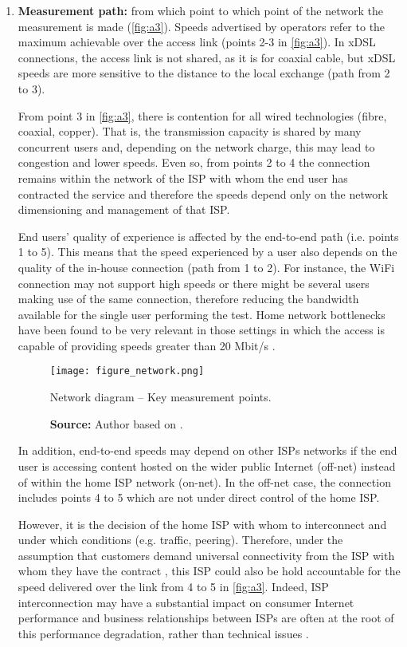 \documentclass[12pt]{article}
\begin{document}
\begin{enumerate}[label=\textbf{\arabic* --}]
	\item \textbf{Measurement path:} from which point to which point of the network the measurement is made (\autoref{fig:a3}). Speeds advertised by operators refer to the maximum achievable over the access link (points 2-3 in \autoref{fig:a3}). In xDSL connections, the access link is not shared, as it is for coaxial cable, but xDSL speeds are more sensitive to the distance to the local exchange (path from 2 to 3). 
	
	From point 3 in \autoref{fig:a3}, there is contention for all wired technologies (fibre, coaxial, copper). That is, the transmission capacity is shared by many concurrent users and, depending on the network charge, this may lead to congestion and lower speeds. Even so, from points 2 to 4 the connection remains within the network of the ISP with whom the end user has contracted the service and therefore the speeds depend only on the network dimensioning and management of that ISP.
	
	End users' quality of experience is affected by the end-to-end path (i.e. points 1 to 5). This means that the speed experienced by a user also depends on the quality of the in-house connection (path from 1 to 2). For instance, the WiFi connection may not support high speeds or there might be several users making use of the same connection, therefore reducing the bandwidth available for the single user performing the test. Home network bottlenecks have been found to be very relevant in those settings in which the access is capable of providing speeds greater than 20 Mbit/s \citep{sundaresan2016}. 
	
\begin{figure}[H]
    \centering
        \texttt{[image: figure\_network.png]}
        \caption{Network diagram -- Key measurement points.}
        \caption*{\textbf{Source:} Author based on \cite{bauer2010}.}
        \label{fig:a3}
\end{figure}   
	
	In addition, end-to-end speeds may depend on other ISPs networks if the end user is accessing content hosted on the wider public Internet (off-net) instead of within the home ISP network (on-net). In the off-net case, the connection includes points 4 to 5 which are not under direct control of the home ISP. 
	
	However, it is the decision of the home ISP with whom to interconnect and under which conditions (e.g. traffic, peering). Therefore, under the assumption that customers demand universal connectivity from the ISP with whom they have the contract \citep[see][pp. 508-511]{economides2008}, this ISP could also be hold accountable for the speed delivered over the link from 4 to 5 in \autoref{fig:a3}. Indeed, ISP interconnection may have a substantial impact on consumer Internet performance and business relationships between ISPs are often at the root of this performance degradation, rather than technical issues \citep{m2014isp}.    


\end{enumerate}
\end{document}
